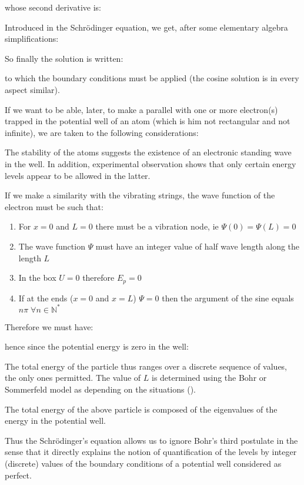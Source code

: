 	whose second derivative is:
	
	Introduced in the Schrödinger equation, we get, after some elementary algebra simplifications:
	
	So finally the solution is written:
	
	to which the boundary conditions must be applied (the cosine solution is in every aspect similar).

	If we want to be able, later, to make a parallel with one or more electron(s) trapped in the potential well of an atom (which is him not rectangular and not infinite), we are taken to the following considerations:

	The stability of the atoms suggests the existence of an electronic standing wave in the well. In addition, experimental observation shows that only certain energy levels appear to be allowed in the latter.

	If we make a similarity with the vibrating strings, the wave function of the electron must be such that:
	\begin{enumerate}
		\item For $x=0$ and $L=0$ there must be a vibration node, ie $\Psi(0)=\Psi(L)=0$

		\item The wave function $\Psi$ must have an integer value of half wave length along the length $L$

		\item In the box $U=0$ therefore $E_p=0$

		\item If at the ends ($x=0$ and $x=L$) $\Psi=0$ then the argument of the sine equals $n\pi\; \forall n\in\mathbb{N}^{*}$
	\end{enumerate}
	Therefore we must have:
	
	hence since the potential energy is zero in the well:
	
	The total energy of the particle thus ranges over a discrete sequence of values, the only ones permitted. The value of $L$ is determined using the Bohr or Sommerfeld model as depending on the situations ().

	The total energy of the above particle is composed of the eigenvalues of the energy in the potential well.

	Thus the Schrödinger's equation allows us to ignore Bohr's third postulate in the sense that it directly explains the notion of quantification of the levels by integer (discrete) values of the boundary conditions of a potential well considered as perfect.

